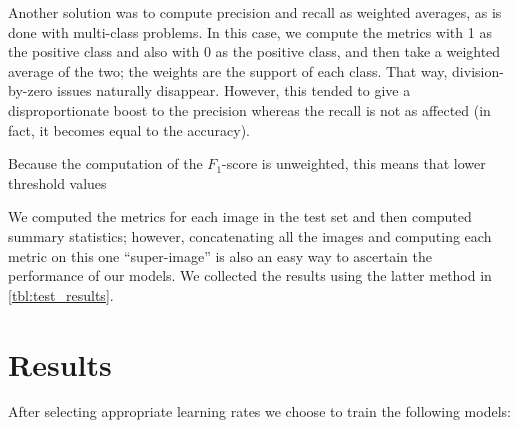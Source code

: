 \documentclass[10pt,conference]{IEEEtran}
\begin{document}
Another solution was to compute precision and recall
as weighted averages, as is done with multi-class
problems. In this case, we compute the metrics 
with 1 as the positive class and also with 0 as the
positive class, and then take a weighted average of
the two; the weights are the support of each class.
That way, division-by-zero issues naturally disappear.
However, this tended to give a disproportionate
boost to the precision whereas the recall is not as
affected (in fact, it becomes equal to the accuracy).

Because the computation of the $F_1$-score is unweighted,
this means that lower threshold values

We computed the metrics for each image in the test set and then computed summary statistics;
however, concatenating all the images and computing each
metric on this one ``super-image'' is also an easy
way to ascertain the performance of our models.
We collected the results using the latter method in
\autoref{tbl:test_results}.


\section{Results}
After selecting appropriate learning rates we choose to train the following models:
\end{document}

